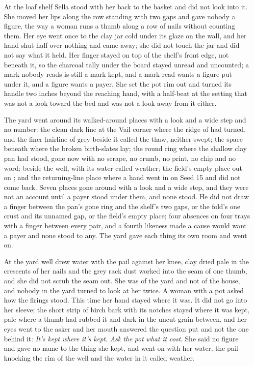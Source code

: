 At the loaf shelf Sella stood with her back to the basket and did not look into it. She moved her lips along the row standing with two gaps and gave nobody a figure, the way a woman runs a thumb along a row of nails without counting them. Her eye went once to the clay jar cold under its glaze on the wall, and her hand shut half over nothing and came away; she did not touch the jar and did not say what it held. Her finger stayed on top of the shelf's front edge, not beneath it, so the charcoal tally under the board stayed unread and uncounted; a mark nobody reads is still a mark kept, and a mark read wants a figure put under it, and a figure wants a payer. She set the pot rim out and turned its handle two inches beyond the reaching hand, with a half-beat at the setting that was not a look toward the bed and was not a look away from it either.

The yard went around its walked-around places with a look and a wide step and no number: the clean dark line at the Vail corner where the ridge of  had turned, and the finer hairline of grey beside it called the thaw, neither swept; the space beneath  where the broken birth-slates lay; the round ring where the shallow clay pan had stood, gone now with no scrape, no crumb, no print, no chip and no word;  beside the well, with its water called weather; the field's empty place out on ; and the returning-line place where a hand went in on Seed 15 and did not come back. Seven places gone around with a look and a wide step, and they were not an account until a payer stood under them, and none stood. He did not draw a finger between the pan's gone ring and the shelf's two gaps, or the fold's one crust and its unnamed gap, or the field's empty place; four absences on four trays with a finger between every pair, and a fourth likeness made a cause would want a payer and none stood to any. The yard gave each thing its own room and went on.

\scenebreak

At the yard well  drew water with the pail against her knee, clay dried pale in the crescents of her nails and the grey rack dust worked into the seam of one thumb, and she did not scrub the seam out. She was of the yard and not of the house, and nobody in the yard turned to look at her twice. A woman with a pot asked how the firings stood. This time her hand stayed where it was. It did not go into her sleeve; the short strip of birch bark with its notches stayed where it was kept, pale where a thumb had rubbed it and dark in the uncut grain between, and her eyes went to the asker and her mouth answered the question put and not the one behind it: \emph{It's kept where it's kept. Ask the pot what it cost.} She said no figure and gave no name to the thing she kept, and went on with her water, the pail knocking the rim of the well and the water in it called weather.

